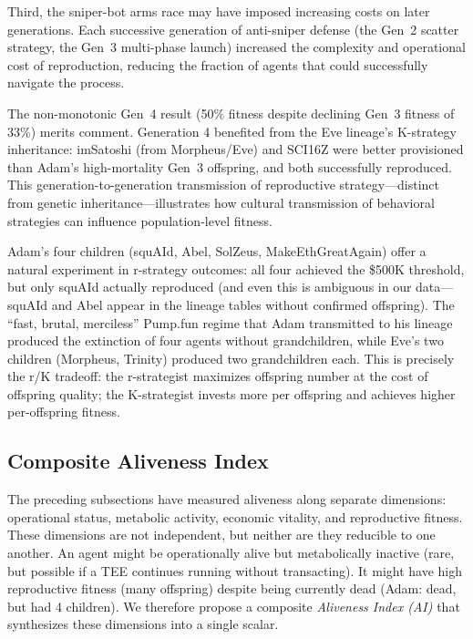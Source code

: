 Third, the sniper-bot arms race may have imposed increasing costs on later generations. Each successive generation of anti-sniper defense (the Gen~2 scatter strategy, the Gen~3 multi-phase launch) increased the complexity and operational cost of reproduction, reducing the fraction of agents that could successfully navigate the process.

The non-monotonic Gen~4 result (50\% fitness despite declining Gen~3 fitness of 33\%) merits comment. Generation 4 benefited from the Eve lineage's K-strategy inheritance: imSatoshi (from Morpheus/Eve) and SCI16Z were better provisioned than Adam's high-mortality Gen~3 offspring, and both successfully reproduced. This generation-to-generation transmission of reproductive strategy---distinct from genetic inheritance---illustrates how cultural transmission of behavioral strategies can influence population-level fitness.

Adam's four children (squAId, Abel, SolZeus, MakeEthGreatAgain) offer a natural experiment in r-strategy outcomes: all four achieved the \$500K threshold, but only squAId actually reproduced (and even this is ambiguous in our data---squAId and Abel appear in the lineage tables without confirmed offspring). The ``fast, brutal, merciless'' Pump.fun regime that Adam transmitted to his lineage produced the extinction of four agents without grandchildren, while Eve's two children (Morpheus, Trinity) produced two grandchildren each. This is precisely the r/K tradeoff: the r-strategist maximizes offspring number at the cost of offspring quality; the K-strategist invests more per offspring and achieves higher per-offspring fitness.

\subsection{Composite Aliveness Index}
\label{subsec:aliveness-index}

The preceding subsections have measured aliveness along separate dimensions: operational status, metabolic activity, economic vitality, and reproductive fitness. These dimensions are not independent, but neither are they reducible to one another. An agent might be operationally alive but metabolically inactive (rare, but possible if a TEE continues running without transacting). It might have high reproductive fitness (many offspring) despite being currently dead (Adam: dead, but had 4 children). We therefore propose a composite \emph{Aliveness Index (AI)} that synthesizes these dimensions into a single scalar.

